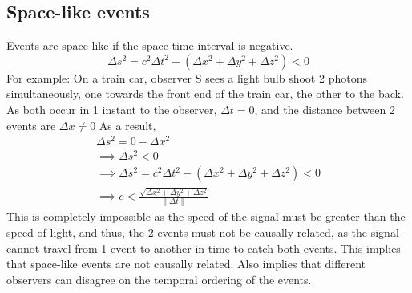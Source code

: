 \documentclass[10pt]{report}
\begin{document}
{\subsection{Space-like events}
\par{Events are space-like if the space-time interval is negative.
\[
\Delta s^{2}=c^{2}\Delta t^{2}-\left(\Delta x^2 + \Delta y^{2}+\Delta z^{2}\right)<0
\] 
For example: On a train car, observer S sees a light bulb shoot 2 photons simultaneously, one towards the front end of the train car, the other to the back. As both occur in 1 instant to the observer, $\Delta t=0$, and the distance between 2 events are $\Delta x\ne0$ As a result, 
\begin{align*}
\Delta s^{2}=0-\Delta x^{2} \\
\implies \Delta s^{2}<0 \\
\implies \Delta s^{2}=c^{2}\Delta t^{2}-\left(\Delta x^2 + \Delta y^{2}+\Delta z^{2}\right)<0 \\
\implies c<\frac{\sqrt{\Delta x^2 + \Delta y^{2}+\Delta z^{2}}}{\|\Delta t\|}
\end{align*}
This is completely impossible as the speed of the signal must be greater than the speed of light, and thus, the 2 events must not be causally related, as the signal cannot travel from 1 event to another in time to catch both events. This implies that space-like events are not causally related. Also implies that different observers can disagree on the temporal ordering of the events. }
}
\end{document}

